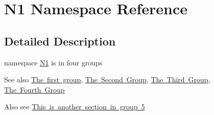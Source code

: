 \hypertarget{namespace_n1}{}\section{N1 Namespace Reference}
\label{namespace_n1}


\subsection{Detailed Description}
namespace \mbox{\hyperlink{namespace_n1}{N1}} is in four groups \begin{DoxySeeAlso}{See also}
\mbox{\hyperlink{group__group1}{The first group}}, \mbox{\hyperlink{group__group2}{The Second Group}}, \mbox{\hyperlink{group__group3}{The Third Group}}, \mbox{\hyperlink{group__group4}{The Fourth Group}}
\end{DoxySeeAlso}
Also see \mbox{\hyperlink{group__group5}{This is another section in group 5}} 